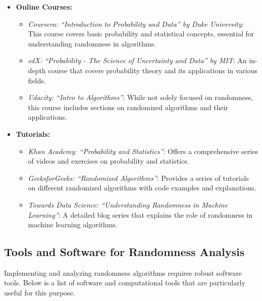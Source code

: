 \documentclass[12pt]{book} %
\begin{document}
\begin{itemize}
    \item \textbf{Online Courses:}
        \begin{itemize}
            \item \textit{Coursera: “Introduction to Probability and Data” by Duke University}: This course covers basic probability and statistical concepts, essential for understanding randomness in algorithms.
            \item \textit{edX: “Probability - The Science of Uncertainty and Data” by MIT}: An in-depth course that covers probability theory and its applications in various fields.
            \item \textit{Udacity: “Intro to Algorithms”}: While not solely focused on randomness, this course includes sections on randomized algorithms and their applications.
        \end{itemize}
    \item \textbf{Tutorials:}
        \begin{itemize}
            \item \textit{Khan Academy: “Probability and Statistics”}: Offers a comprehensive series of videos and exercises on probability and statistics.
            \item \textit{GeeksforGeeks: “Randomized Algorithms”}: Provides a series of tutorials on different randomized algorithms with code examples and explanations.
            \item \textit{Towards Data Science: “Understanding Randomness in Machine Learning”}: A detailed blog series that explains the role of randomness in machine learning algorithms.
        \end{itemize}
\end{itemize}

\subsection{Tools and Software for Randomness Analysis}
Implementing and analyzing randomness algorithms requires robust software tools. Below is a list of software and computational tools that are particularly useful for this purpose.
\end{document}
